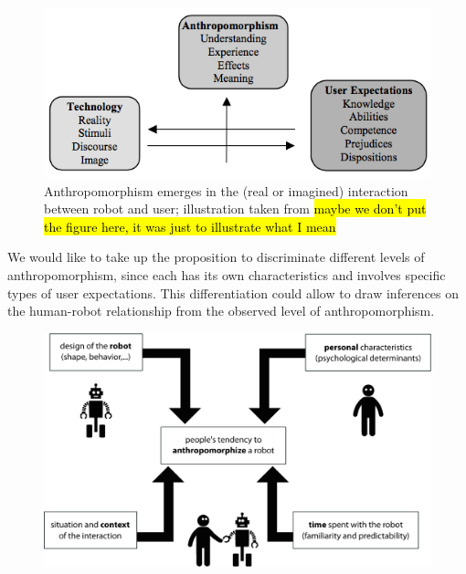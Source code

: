 \documentclass{frontiersSCNS} %
\begin{document}
\begin{figure}[ht!]\centering
  \includegraphics[scale=0.42]{persson_anthropomorphism.png}
 \caption{Anthropomorphism emerges in the (real or imagined) interaction between
 robot and user; illustration taken from \cite{persson_anthropomorphism_2000}
 \hl{maybe we don't put the figure here, it was just to illustrate what I mean}}

 \label{fig:anthropomorphism_and_interaction}       %
 \end{figure}

We would like to take up the proposition to discriminate different levels of
anthropomorphism, since each has its own characteristics and involves specific
types of user expectations. This differentiation could allow to draw inferences
on the human-robot relationship from the observed level of anthropomorphism.

\begin{figure}
    \centering
    \includegraphics[width=0.6\columnwidth]{factors}
    \caption{}
    \label{factors}
\end{figure}


%
%
%
%
%
%
%
%
%
\end{document}
